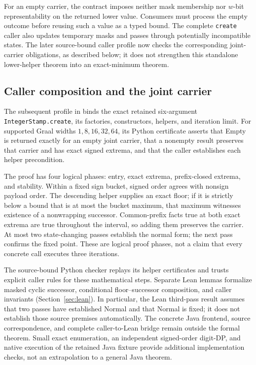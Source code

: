 For an empty carrier, the contract imposes neither mask membership nor $w$-bit representability on the returned lower value. Consumers must process the empty outcome before reusing such a value as a typed bound. The complete \texttt{create} caller also updates temporary masks and passes through potentially incompatible states. The later source-bound caller profile now checks the corresponding joint-carrier obligations, as described below; it does not strengthen this standalone lower-helper theorem into an exact-minimum theorem.


\subsection{Caller composition and the joint carrier}
The subsequent profile in  binds the exact retained six-argument \texttt{IntegerStamp.create}, its factories, constructors, helpers, and iteration limit. For supported Graal widths $1,8,16,32,64$, its Python certificate asserts that Empty is returned exactly for an empty joint carrier, that a nonempty result preserves that carrier and has exact signed extrema, and that the caller establishes each helper precondition.

The proof has four logical phases: entry, exact extrema, prefix-closed extrema, and stability. Within a fixed sign bucket, signed order agrees with nonsign payload order. The descending helper supplies an exact floor; if it is strictly below a bound that is at most the bucket maximum, that maximum witnesses existence of a nonwrapping successor. Common-prefix facts true at both exact extrema are true throughout the interval, so adding them preserves the carrier. At most two state-changing passes establish the normal form; the next pass confirms the fixed point. These are logical proof phases, not a claim that every concrete call executes three iterations.

The source-bound Python checker replays its helper certificates and trusts explicit caller rules for these mathematical steps. Separate Lean lemmas formalize masked cyclic successor, conditional floor--successor composition, and caller invariants (Section~\ref{sec:lean}). In particular, the Lean third-pass result assumes that two passes have established Normal and that Normal is fixed; it does not establish those source premises automatically. The concrete Java frontend, source correspondence, and complete caller-to-Lean bridge remain outside the formal theorem. Small exact enumeration, an independent signed-order digit-DP, and native execution of the retained Java fixture provide additional implementation checks, not an extrapolation to a general Java theorem.

